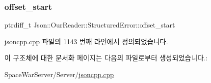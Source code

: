 \subsubsection{\texorpdfstring{offset\+\_\+start}{offset\_start}}
{\footnotesize\ttfamily ptrdiff\+\_\+t Json\+::\+Our\+Reader\+::\+Structured\+Error\+::offset\+\_\+start}



jsoncpp.\+cpp 파일의 1143 번째 라인에서 정의되었습니다.



이 구조체에 대한 문서화 페이지는 다음의 파일로부터 생성되었습니다.\+:\begin{DoxyCompactItemize}
\item 
Space\+War\+Server/\+Server/\hyperlink{jsoncpp_8cpp}{jsoncpp.\+cpp}\end{DoxyCompactItemize}
